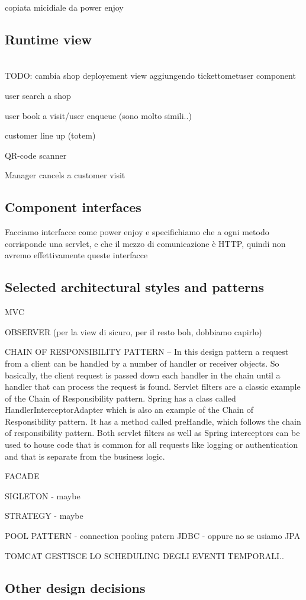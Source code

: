 copiata micidiale da power enjoy

\subsection{Runtime view}
\label{subsect:runtimeview}

\\TODO: cambia shop deployement view aggiungendo tickettometuser component


user search a shop

user book a visit/user enqueue (sono molto simili..)

customer line up (totem)

QR-code scanner

Manager cancels a customer visit

\subsection{Component interfaces}
\label{subsect:componentinterfaces}

Facciamo interfacce come power enjoy e specifichiamo che a ogni metodo corrisponde una servlet, e che il mezzo di comunicazione è HTTP, quindi non avremo effettivamente queste interfacce

\subsection{Selected architectural styles and patterns}
\label{subsect:selectedarchitecturalstylesandpatterns}

MVC

OBSERVER (per la view di sicuro, per il resto boh, dobbiamo capirlo)

CHAIN OF RESPONSIBILITY PATTERN – In this design pattern a request from a client can be handled by a number of handler or receiver objects. So basically, the client request is passed down each handler in the chain until a handler that can process the request is found. Servlet filters are a classic example of the Chain of Responsibility pattern. Spring has a class called HandlerInterceptorAdapter which is also an example of the Chain of Responsibility pattern. It has a method called preHandle, which follows the chain of responsibility pattern. Both servlet filters as well as Spring interceptors can be used to house code that is common for all requests like logging or authentication and that is separate from the business logic.

FACADE

SIGLETON - maybe

STRATEGY - maybe

POOL PATTERN - connection pooling patern JDBC - oppure no se usiamo JPA

TOMCAT GESTISCE LO SCHEDULING DEGLI EVENTI TEMPORALI..

\subsection{Other design decisions}
\label{subsect:otherdesigndecisions}


